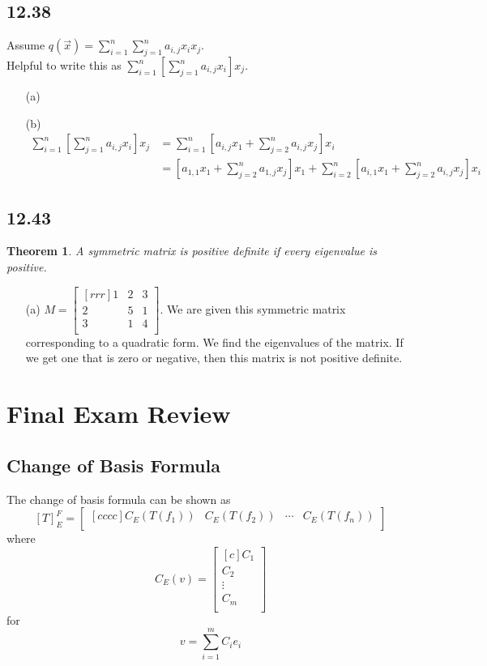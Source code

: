 \documentclass{report}
\theoremstyle{plain}
\newtheorem*{thrm}{Theorem}
\theoremstyle{definition}
\theoremstyle{plain}
\begin{document}
\subsection{12.38}
Assume $q(\vec{x})=\sum_{i=1}^n\sum_{j=1}^na_{i,j}x_ix_j$.\\
Helpful to write this as $\sum_{i=1}^n \left[ \sum_{j=1}^na_{i,j}x_i \right] x_j$.
\begin{enumerate}
\item[(a)]
\item[(b)]
\begin{align*}
\sum_{i=1}^n \left[ \sum_{j=1}^na_{i,j}x_i \right] x_j &= \sum_{i=1}^n\left[ a_{i,j}x_1 + \sum_{j=2}^na_{i,j}x_j\right] x_i\\
&= \left[ a_{1,1}x_1+\sum_{j=2}^n a_{1,j}x_j \right] x_1 + \sum_{i=2}^n \left[ a_{i,1}x_1+\sum_{j=2}^n a_{i,j}x_j\right] x_i
\end{align*}
\end{enumerate}

\subsection{12.43}
\begin{thrm}
A symmetric matrix is positive definite if every eigenvalue is positive.
\end{thrm}
\begin{enumerate}
\item[(a)]$M=\begin{bmatrix}[rrr]1&2&3\\2&5&1\\3&1&4\\\end{bmatrix}$. We are given this symmetric matrix corresponding to a quadratic form. We find the eigenvalues of the matrix. If we get one that is zero or negative, then this matrix is not positive definite.
\end{enumerate}

\section{Final Exam Review}
\subsection{Change of Basis Formula}
The change of basis formula can be shown as
\[ [T]_E^F = \begin{bmatrix}[cccc]C_E(T(f_1)) & C_E(T(f_2)) & \cdots & C_E(T(f_n))\\\end{bmatrix} \]
where
\[ C_E(v) = \begin{bmatrix}[c]C_1\\C_2\\\vdots\\C_m\\\end{bmatrix} \]
for
\[ v=\sum_{i=1}^mC_ie_i \]
\end{document}
